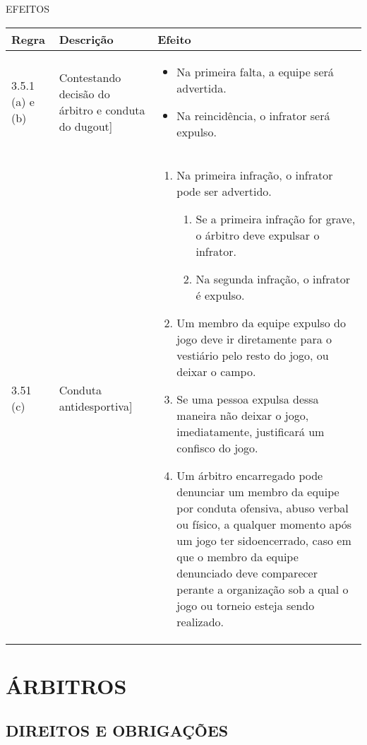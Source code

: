 EFEITOS

{\footnotesize\begin{tabular}{p{20mm}p{50mm}p{90mm}}
		Regra& Descrição & Efeito\\\hline
		3.5.1 (a) e (b) & Contestando decisão do árbitro e conduta do \gls{dugout}] &

		\begin{itemize}
			\item Na primeira falta, a equipe será advertida.
			\item Na reincidência, o infrator será expulso.
		\end{itemize}
		\\
		3.51 (c) & Conduta antidesportiva] &
		\begin{enumerate}[label=(\alph*)]
			\item Na primeira infração, o infrator pode ser advertido.

			\begin{enumerate}[label=\roman*.]
				\item Se a primeira infração for grave, o árbitro deve expulsar o infrator.
				\item Na segunda infração, o infrator é expulso.
			\end{enumerate}

			\item Um membro da equipe expulso do jogo deve ir diretamente para o vestiário pelo resto do jogo, ou deixar o campo.
			\item Se uma pessoa expulsa dessa maneira não deixar o jogo, imediatamente, justificará um confisco do jogo.
			\item Um árbitro encarregado pode denunciar um membro da equipe por conduta ofensiva, abuso verbal ou físico, a qualquer momento após um jogo ter sidoencerrado, caso em que o membro da equipe denunciado deve comparecer
			perante a organização sob a qual o jogo ou torneio esteja sendo realizado.
		\end{enumerate}
		\\\end{tabular}}

\section{ÁRBITROS}

\subsection{DIREITOS E OBRIGAÇÕES}

